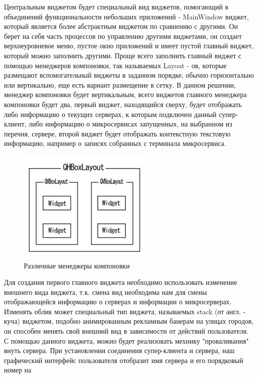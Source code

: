 \documentclass[a4paper, 14pt]{extreport}
\begin{document}
\par Центральным виджетом будет специальный вид виджетов, помогающий в объединений функциональности небольших приложений - MainWindow
виджет, который является более абстрактным виджетом по сравнению с другими. Он берет на себя часть процессов по управлению другими 
виджетами, он создает верхнеуровневое меню, пустое окно приложений и имеет пустой главный виджет, который можно заполнить другими.
Проще всего заполнить главный виджет с помощью менеджеров компоновки, так называемых Layout - ов, которые размещают вспомогательный виджеты 
в заданном порядке, обычно горизонтально или вертикально, еще есть вариант размещение в сетку. В данном решении, менеджер компоновки будет
вертикальным, всего виджетов главного менеджера компоновки будет два, первый виджет, находящийся сверху, будет отображать либо информацию о
текущих серверах, к которым подключен данный супер-клиент, либо информацию о микросервисах запущенных, на выбранном из перечня, сервере,
второй виджет будет отображать контекстную текстовую информацию, например о записях собранных с терминала микросервиса.
\begin{figure}[ht]
\begin{center}
\includegraphics[scale = 0.6]{./figure/layout_examp}
\caption{Различные менеджеры компоновки}
\label{fig:manip_photo}
\end{center}
\end{figure}
\par Для создания первого главного виджета необходимо использовать изменение внешнего вида виджета, т.к. смена вид необходима нам для 
смены отображающейся информацию о серверах и информации о микросерверах. Изменять облик может специальный тип виджета, называемых
stack (от англ. - куча) виджетом, подобно анимированным рекламным банерам на улицах городов, он способен менять свой внешний вид в
зависимости от действий пользователя. С помощью данного виджета, можно будет реализовать мехнику "проваливания" внуть сервера. При
установлении соединения супер-клиента и сервера, наш графический интерфейс пользователя отобразит имя сервера и его порядковый номер на
\end{document}
